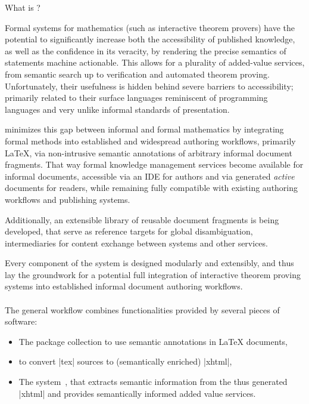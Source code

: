 \begin{sfragment}{What is \sTeX?}
  
Formal systems for mathematics (such as interactive theorem provers)
have the potential to significantly increase both the accessibility
of published knowledge, as well as the confidence in its veracity,
by rendering the precise semantics of statements machine actionable.
This allows for a plurality of added-value services, from semantic
search up to verification and automated theorem proving.
Unfortunately, their usefulness is hidden behind severe barriers
to accessibility; primarily related to their surface languages
reminiscent of programming languages and very unlike informal
standards of presentation.

\sTeX minimizes this gap between informal and formal 
mathematics by integrating formal methods into established
and widespread authoring workflows, primarily \LaTeX, via 
non-intrusive semantic
annotations of arbitrary informal document fragments. That way
formal knowledge management services become available for informal
documents, accessible via an IDE for authors and via generated
\emph{active} documents for readers, while remaining fully compatible
with existing authoring workflows and publishing systems.

Additionally, an extensible library of reusable
document fragments is being developed, that serve as reference targets
for global disambiguation, intermediaries for content exchange
between systems and other services.

Every component of the system is designed modularly and extensibly,
and thus lay the groundwork for a potential full integration of
interactive theorem proving systems into established informal document
authoring workflows.

\paragraph{} The general \sTeX workflow combines functionalities
provided by several pieces of software:
\begin{itemize}
\item The \sTeX package collection to use semantic annotations in {\LaTeX} documents,
\item \RusTeX\cite{RusTeX:on} to convert |tex| sources to (semantically enriched) |xhtml|,
\item The \mmt system~\cite{uniformal:on}, that extracts semantic information from the
  thus generated |xhtml| and provides semantically informed added value services.
\end{itemize}



\end{sfragment}
